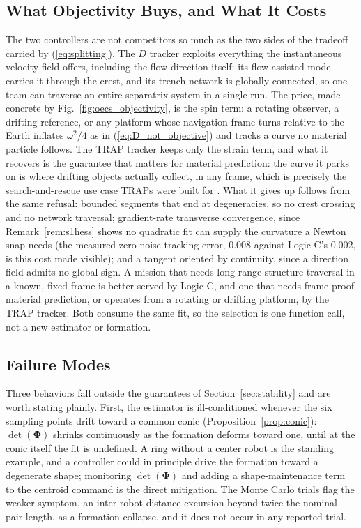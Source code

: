 \documentclass[lettersize,journal]{IEEEtran}
\begin{document}
\subsection{What Objectivity Buys, and What It Costs}
\label{sec:objectivity_tradeoff}

The two controllers are not competitors so much as the two sides of
the tradeoff carried by (\ref{eq:splitting}). The $D$ tracker exploits
everything the instantaneous velocity field offers, including the flow
direction itself: its flow-assisted mode carries it through the crest,
and its trench network is globally connected, so one team can traverse
an entire separatrix system in a single run. The price, made concrete
by Fig.~\ref{fig:oecs_objectivity}, is the spin term: a rotating
observer, a drifting reference, or any platform whose navigation frame
turns relative to the Earth inflates $\omega^2/4$ as in
(\ref{eq:D_not_objective}) and tracks a curve no material particle
follows. The TRAP tracker keeps only the strain term, and what it
recovers is the guarantee that matters for material prediction: the
curve it parks on is where drifting objects actually collect, in any
frame, which is precisely the search-and-rescue use case TRAPs were
built for \cite{36}. What it gives up follows from the same refusal:
bounded segments that end at degeneracies, so no crest crossing and no
network traversal; gradient-rate transverse convergence, since
Remark~\ref{rem:s1hess} shows no quadratic fit can supply the
curvature a Newton snap needs (the measured zero-noise tracking error,
0.008 against Logic C's 0.002, is this cost made visible); and a
tangent oriented by continuity, since a direction field admits no
global sign. A mission that needs long-range structure traversal in a
known, fixed frame is better served by Logic C, and one that needs
frame-proof material prediction, or operates from a rotating or
drifting platform, by the TRAP tracker. Both consume the same fit, so
the selection is one function call, not a new estimator or formation.

\subsection{Failure Modes}

Three behaviors fall outside the guarantees of
Section~\ref{sec:stability} and are worth stating plainly. First, the
estimator is ill-conditioned whenever the six sampling points drift
toward a common conic (Proposition~\ref{prop:conic}):
$\det(\boldsymbol{\Phi})$ shrinks continuously as the formation
deforms toward one, until at the conic itself the fit is undefined. A
ring without a center robot is the standing example, and a controller
could in principle drive the formation toward a degenerate shape;
monitoring $\det(\boldsymbol{\Phi})$ and adding a shape-maintenance
term to the centroid command is the direct mitigation. The Monte Carlo
trials flag the weaker symptom, an inter-robot distance excursion
beyond twice the nominal pair length, as a formation collapse, and it
does not occur in any reported trial.
\end{document}
